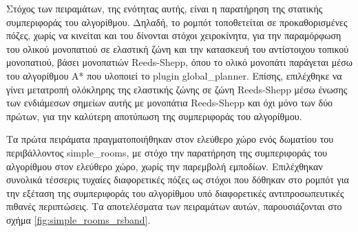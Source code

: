 \bigskip
Στόχος των πειραμάτων, της ενότητας αυτής, είναι η παρατήρηση της στατικής συμπεριφοράς του αλγορίθμου. Δηλαδή, το ρομπότ τοποθετείται σε προκαθορισμένες πόζες, χωρίς να κινείται και του δίνονται στόχοι χειροκίνητα, για την παραμόρφωση του ολικού μονοπατιού σε ελαστική ζώνη και την κατασκευή του αντίστοιχου τοπικού μονοπατιού, βάσει μονοπατιών Reeds-Shepp, όπου το ολικό μονοπάτι παράγεται μέσω του αλγορίθμου A* που υλοποιεί το plugin global{\_}planner. Επίσης, επιλέχθηκε να γίνει μετατροπή ολόκληρης της ελαστικής ζώνης σε ζώνη Reeds-Shepp μέσω ένωσης των ενδιάμεσων σημείων αυτής με μονοπάτια Reeds-Shepp και όχι μόνο των δύο πρώτων, για την καλύτερη αποτύπωση της συμπεριφοράς του αλγορίθμου.

\bigskip
Τα πρώτα πειράματα πραγματοποιήθηκαν στον ελεύθερο χώρο ενός δωματίου του περιβάλλοντος simple{\_}rooms, με στόχο την παρατήρηση της συμπεριφοράς του αλγορίθμου στον ελεύθερο χώρο, χωρίς την παρεμβολή εμποδίων. Επιλέχθηκαν συνολικά τέσσερις τυχαίες διαφορετικές πόζες ως στόχοι που δόθηκαν στο ρομπότ για την εξέταση της συμπεριφοράς του αλγορίθμου υπό διαφορετικές αντιπροσωπευτικές πιθανές περιπτώσεις. Τα αποτελέσματα των πειραμάτων αυτών, παρουσιάζονται στο σχήμα \ref{fig:simple_rooms_rsband}.

